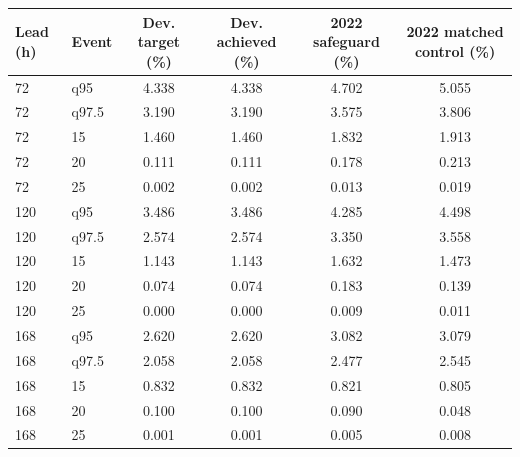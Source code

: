 \begin{tabular}{llcccc}
\hline
Lead (h) & Event & Dev. target (\%) & Dev. achieved (\%) & 2022 safeguard (\%) & 2022 matched control (\%) \\
\hline
72 & q95 & 4.338 & 4.338 & 4.702 & 5.055 \\
72 & q97.5 & 3.190 & 3.190 & 3.575 & 3.806 \\
72 & 15 & 1.460 & 1.460 & 1.832 & 1.913 \\
72 & 20 & 0.111 & 0.111 & 0.178 & 0.213 \\
72 & 25 & 0.002 & 0.002 & 0.013 & 0.019 \\
120 & q95 & 3.486 & 3.486 & 4.285 & 4.498 \\
120 & q97.5 & 2.574 & 2.574 & 3.350 & 3.558 \\
120 & 15 & 1.143 & 1.143 & 1.632 & 1.473 \\
120 & 20 & 0.074 & 0.074 & 0.183 & 0.139 \\
120 & 25 & 0.000 & 0.000 & 0.009 & 0.011 \\
168 & q95 & 2.620 & 2.620 & 3.082 & 3.079 \\
168 & q97.5 & 2.058 & 2.058 & 2.477 & 2.545 \\
168 & 15 & 0.832 & 0.832 & 0.821 & 0.805 \\
168 & 20 & 0.100 & 0.100 & 0.090 & 0.048 \\
168 & 25 & 0.001 & 0.001 & 0.005 & 0.008 \\
\hline
\end{tabular}

